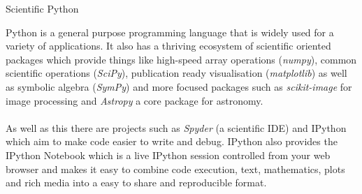 \documentclass[a0paper,landscape]{baposter}
\begin{document}
\begin{poster}
\begin{posterbox}[name=scipy,span=2,column=0,row=0,below=examples,above=bottom]{Scientific Python}
\begin{figure}

\end{figure}
Python is a general purpose programming language that is widely used for a variety of applications.
It also has a thriving ecosystem of scientific oriented packages which provide things like high-speed array operations (\textit{numpy}), common scientific operations (\textit{SciPy}), publication ready visualisation (\textit{matplotlib}) as well as symbolic algebra (\textit{SymPy}) and more focused packages such as \textit{scikit-image} for image processing and \textit{Astropy} a core package for astronomy.
\\
\\
As well as this there are projects such as \textit{Spyder} (a scientific IDE) and IPython which aim to make code easier to write and debug. IPython also provides the IPython Notebook which is a live IPython session controlled from your web browser and makes it easy to combine code execution, text, mathematics, plots and rich media into a easy to share and reproducible format.

\begin{figure}[H]
\centering

\end{figure}
\end{posterbox}

\end{poster}
\end{document}
